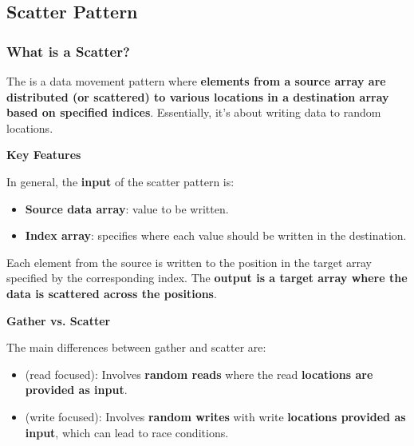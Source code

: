 \subsection{Scatter Pattern}

\subsubsection{What is a Scatter?}

The  is a data movement pattern where \textbf{elements from a source array are distributed (or scattered) to various locations in a destination array based on specified indices}. Essentially, it's about writing data to random locations.

\highspace
\begin{flushleft}
    \textcolor{Green3}{ \textbf{Key Features}}
\end{flushleft}
In general, the \textbf{input} of the scatter pattern is:
\begin{itemize}
    \item \textbf{Source data array}: value to be written.
    \item \textbf{Index array}: specifies where each value should be written in the destination.
\end{itemize}
Each element from the source is written to the position in the target array specified by the corresponding index. The \textbf{output is a target array where the data is scattered across the positions}.

\highspace
\begin{flushleft}
    \textcolor{Green3}{ \textbf{Gather vs. Scatter}}
\end{flushleft}
The main differences between gather and scatter are:
\begin{itemize}
    \item {} (read focused): Involves \textbf{random reads} where the read \textbf{locations are provided as input}.
    \item {} (write focused): Involves \textbf{random writes} with write \textbf{locations provided as input}, which can lead to race conditions.
\end{itemize}

